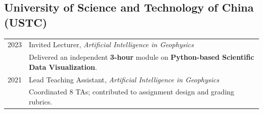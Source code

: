 \subsection*{University of Science and Technology of China (USTC)}

\begin{longtable}[l]{@{}p{} p{}@{}}

2023 & Invited Lecturer, \textit{Artificial Intelligence in Geophysics} \\
     & \hspace{1em} Delivered an independent \textbf{3-hour} module on \textbf{Python-based Scientific Data Visualization}. \\[6pt]

2021 & Lead Teaching Assistant, \textit{Artificial Intelligence in Geophysics} \\
     & \hspace{1em} Coordinated 8 TAs; contributed to assignment design and grading rubrics. \\

\end{longtable}
